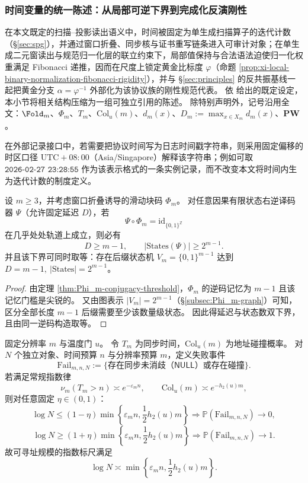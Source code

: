 \subsubsection{时间变量的统一陈述：从局部可逆下界到完成化反演刚性}\label{subsubsec:xi-time-protocol-conclusions}
在本文既定的扫描--投影读出语义中，时间被固定为单生成扫描算子的迭代计数（\S\ref{sec:spg}），并通过窗口折叠、同步核与证书重写链条进入可审计对象；在单生成二元窗读出与规范归一化层的联立约束下，局部值保持与合法语法迫使归一化权重满足 Fibonacci 递推，因而在尺度上锁定黄金比标度 \(\varphi\)（命题 \ref{prop:xi-local-binary-normalization-fibonacci-rigidity}），并与 \S\ref{sec:principles} 的反共振基线一起把黄金分支 \(\alpha=\varphi^{-1}\) 外部化为该协议族的刚性规范代表。
依 \cite{Internal2026POMGenerativeAddressThreeRegisterBridgeRH} 给出的既定设定，本小节将相关结构压缩为一组可独立引用的陈述。
除特别声明外，记号沿用全文：\(\Fold_m\)、\(\Phi_m\)、\(T_m\)、\(\mathrm{Col}_u(m)\)、\(d_m(x)\)、\(D_m:=\max_{x\in X_m}d_m(x)\)、\(\mathbf{PW}\)。
\par
在外部记录接口中，若需要把协议时间写为日志时间戳字符串，则采用固定偏移的时区口径 \(\mathrm{UTC}{+}08{:}00\)（Asia/Singapore）解释该字符串；例如可取
\(\texttt{2026-02-27 23:28:55}\)
作为该表示格式的一条实例记录，而不改变本文将时间内生为迭代计数的制度定义。

\begin{theorem}\label{thm:xi-time-min-delay-min-states}
设 \(m\ge 3\)，并考虑窗口折叠诱导的滑动块码 \(\Phi_m\)。
对任意因果有限状态右逆译码器 \(\Psi\)（允许固定延迟 \(D\)），若
\[
\Psi\circ\Phi_m=\mathrm{id}_{\{0,1\}^{\mathbb Z}}
\]
在几乎处处轨道上成立，则必有
\[
D\ge m-1,
\qquad
|\mathrm{States}(\Psi)|\ge 2^{m-1}.
\]
并且该下界可同时取等：存在后缀状态机 \(V_m=\{0,1\}^{m-1}\) 达到
\(
D=m-1,\ |\mathrm{States}|=2^{m-1}
\)。
\end{theorem}

\begin{proof}
由定理 \ref{thm:Phi_m-conjugacy-threshold}，\(\Phi_m\) 的逆码记忆为 \(m-1\) 且该记忆门槛是尖锐的。
又由图表示 \(|V_m|=2^{m-1}\)（\S\ref{subsec:Phi_m-graph}）可知，区分全部长度 \(m-1\) 后缀需要至少该数量级状态。
因此得延迟与状态数双下界，且由同一逆码构造取等。
\end{proof}

\begin{theorem}\label{thm:xi-time-resolution-dual-budget-phase-transition}
固定分辨率 \(m\) 与温度门 \(u\)。
令 \(T_m\) 为同步时间，\(\mathrm{Col}_u(m)\) 为地址碰撞概率。
对 \(N\) 个独立对象、时间预算 \(n\) 与分辨率预算 \(m\)，定义失败事件
\[
\mathrm{Fail}_{m,n,N}:=\{\text{存在同步未消歧（\(\mathsf{NULL}\)）或存在碰撞}\}.
\]
若满足常规指数律
\[
\nu_m(T_m>n)\asymp e^{-\varepsilon_m n},
\qquad
\mathrm{Col}_u(m)\asymp e^{-h_2(u)m},
\]
则对任意固定 \(\eta\in(0,1)\)：
\[
\log N\le (1-\eta)\min\!\left\{\varepsilon_m n,\frac12 h_2(u)m\right\}
\Longrightarrow
\mathbb P(\mathrm{Fail}_{m,n,N})\to 0,
\]
\[
\log N\ge (1+\eta)\min\!\left\{\varepsilon_m n,\frac12 h_2(u)m\right\}
\Longrightarrow
\mathbb P(\mathrm{Fail}_{m,n,N})\to 1.
\]
故可寻址规模的指数标尺满足
\[
\log N\asymp \min\!\left\{\varepsilon_m n,\frac12 h_2(u)m\right\}.
\]
\end{theorem}

